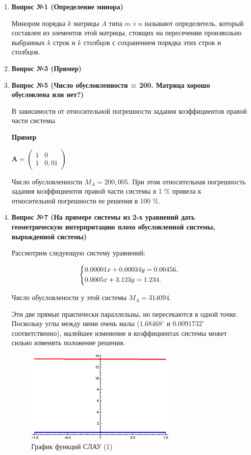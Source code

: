 \documentclass[12pt, a4paper]{article}
\begin{document}
	\begin{enumerate}
		\item \textbf{Вопрос №1 (Определение минора)}
		
		Минором порядка $k$ матрицы $A$ типа $m \times n$ называют определитель, который составлен из элементов этой матрицы, стоящих на пересечении произвольно выбранных $k$ строк и $k$ столбцов с сохранением порядка этих строк и столбцов.
		
		\item \textbf{Вопрос №3 (Пример)}
		
		\item \textbf{Вопрос №5 (Число обусловленности = 200. Матрица хорошо обусловлена или нет?)}
	
		В зависимости от относительной погрешности задания коэффициентов правой части системы.
		
		\textbf{Пример}
		
		$\mathbf{A}= \left(
		\begin{matrix}
			1 & 0 \\
			1 & 0,01
		\end{matrix}\right)$ 
		
		Число обусловленности $M_{A}=200,005$. При этом относительная погрешность задания коэффициентов правой части системы в 1 $\%$ привела к относительной погрешности ее решения в 100 $\%$.
		
		\item \textbf{Вопрос №7 (На примере системы из 2-х уравнений дать геометрическую интерпритацию плохо обусловленной системы, вырожденной системы)}
		
		Рассмотрим следующую систему уравнений:
	
		\begin{equation}
			\begin{dcases}
				0.00001x + 0.00034y = 0.00456, \\
				0.0005x + 3.123y = 1.234. 
			\end{dcases}
		\end{equation}
		
		Число обусловлености у этой системы $M_{A}= 314094$.
		
		Эти две прямые практически параллельны, но пересекаются в одной точке. Поскольку углы между ними очень малы ($1.68468^\circ$ и $0.0091732^\circ$ соответственно), малейшее изменение в коэффициентах системы может сильно изменить положение решения.
		
		\begin{figure}[!h]
			\center
			\includegraphics[width=0.7\textwidth]{graph1}
			\caption{График функций СЛАУ (1)}
			\label{graph1}
		\end{figure}	
	

\end{enumerate}
\end{document}

